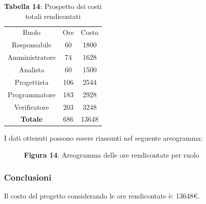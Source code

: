 \begin{table}[H]
	\centering
	\renewcommand{\arraystretch}{1.5}
	\begin{tabular}{|c|c|c|}
		\hline
		\rowcolor{lighter-grayer}
		Ruolo & Ore & Costo \\
Responsabile   & 60  & 1800  \\ \hline
Amministratore & 74  & 1628  \\ \hline
Analista       & 60  & 1500  \\ \hline
Progettista    & 106 & 2544  \\ \hline
Programmatore  & 183 & 2928  \\ \hline
Verificatore   & 203 & 3248  \\ \hline
\textbf{Totale}& 686 & 13648 \\ \hline
	\end{tabular}
	\caption*{\textbf{Tabella 14}: Prospetto dei costi totali rendicontati \\}
\end{table}

I dati ottenuti possono essere riassunti nel seguente areogramma:


\begin{figure}[H]
	\centering
	\caption*{\textbf{Figura 14}: Areogramma delle ore rendicontate per ruolo}
    \label{fig:Figura10}
\end{figure}

\subsubsection{Conclusioni}
Il costo del progetto considerando le ore rendicontate è: 13648\euro.